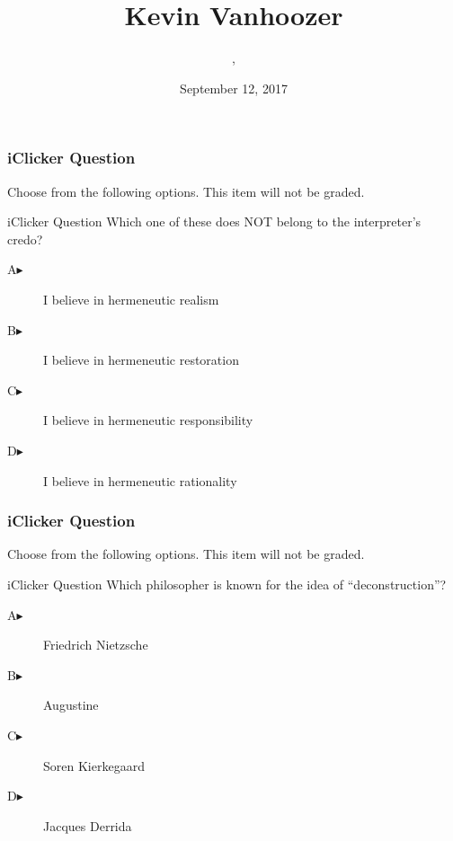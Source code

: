 \documentclass[xcolor=dvipsnames]{beamer}
\title{Kevin Vanhoozer}
\subtitle{{\CourseNumber}, {\CourseInst}}
\author{\CourseName}
\date{September 12, 2017}
\begin{document}
\begin{frame}
  \titlepage
\end{frame}


\begin{frame}
  \frametitle{iClicker Question}
Choose from the following options. This item will not be graded.
\begin{block}{iClicker Question}
Which one of these does NOT belong to the interpreter's credo?
\end{block}
\begin{description}
\item[A\hspace{.2in}$\blacktriangleright$] I believe in hermeneutic realism
\item[B\hspace{.2in}$\blacktriangleright$] I believe in hermeneutic restoration
\item[C\hspace{.2in}$\blacktriangleright$] I believe in hermeneutic responsibility
\item[D\hspace{.2in}$\blacktriangleright$] I believe in hermeneutic rationality
\end{description}
\end{frame}

\begin{frame}
  \frametitle{iClicker Question}
Choose from the following options. This item will not be graded.
\begin{block}{iClicker Question}
Which philosopher is known for the idea of ``deconstruction''?
\end{block}
\begin{description}
\item[A\hspace{.2in}$\blacktriangleright$] Friedrich Nietzsche
\item[B\hspace{.2in}$\blacktriangleright$] Augustine
\item[C\hspace{.2in}$\blacktriangleright$] S{\/o}ren Kierkegaard
\item[D\hspace{.2in}$\blacktriangleright$] Jacques Derrida
\end{description}
\end{frame}
\end{document}
